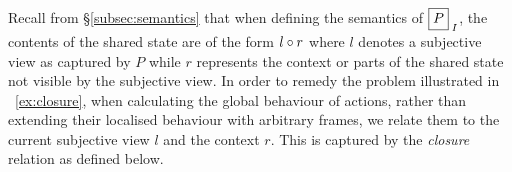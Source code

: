 %
%
Recall from \S\ref{subsec:semantics} that when defining the semantics of $\shared{P}{I}$, the contents of the shared state are of the form $l \circ r$ where $l$ denotes a subjective view as captured by $P$ while $r$ represents the context or parts of the shared state not visible by the subjective view. In order to remedy the problem illustrated in \ex~\ref{ex:closure}, when calculating the global behaviour of actions, rather than extending their localised behaviour with arbitrary frames, we relate them to the current subjective view $l$ and the context $r$. This is captured by the \emph{closure} relation as defined below.
%
%
%
